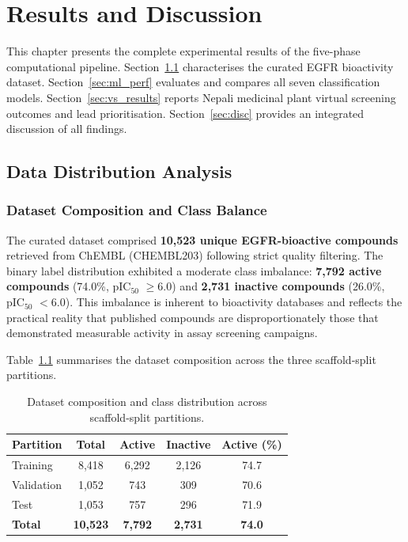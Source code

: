 \chapter{Results and Discussion}

This chapter presents the complete experimental results of the five-phase
computational pipeline. Section~\ref{sec:data_dist} characterises the curated
EGFR bioactivity dataset. Section~\ref{sec:ml_perf} evaluates and compares all
seven classification models. Section~\ref{sec:vs_results} reports Nepali
medicinal plant virtual screening outcomes and lead prioritisation.
Section~\ref{sec:disc} provides an integrated discussion of all findings.

\section{Data Distribution Analysis}
\label{sec:data_dist}

\subsection{Dataset Composition and Class Balance}

The curated dataset comprised \textbf{10,523 unique EGFR-bioactive compounds}
retrieved from ChEMBL (CHEMBL203) following strict quality filtering. The binary
label distribution exhibited a moderate class imbalance: \textbf{7,792 active
compounds} (74.0\%, \texorpdfstring{pIC$_{50}$}{pIC50} $\geq 6.0$) and
\textbf{2,731 inactive compounds} (26.0\%,
\texorpdfstring{pIC$_{50}$}{pIC50} $< 6.0$). This imbalance is inherent to
bioactivity databases and reflects the practical reality that published compounds
are disproportionately those that demonstrated measurable activity in assay
screening campaigns.

Table~\ref{tab:dataset_overview} summarises the dataset composition across the
three scaffold-split partitions.

\begin{table}[H]
\centering
\caption{Dataset composition and class distribution across scaffold-split partitions.}
\label{tab:dataset_overview}
{\singlespacing
\begin{tabular}{lcccc}
\toprule
\textbf{Partition} & \textbf{Total} & \textbf{Active} & \textbf{Inactive}
                   & \textbf{Active (\%)} \\
\midrule
Training   & 8{,}418 & 6{,}292 & 2{,}126 & 74.7 \\
Validation & 1{,}052 &     743 &     309 & 70.6 \\
Test       & 1{,}053 &     757 &     296 & 71.9 \\
\midrule
\textbf{Total} & \textbf{10{,}523} & \textbf{7{,}792} & \textbf{2{,}731}
               & \textbf{74.0} \\
\bottomrule
\end{tabular}
}
\end{table}

